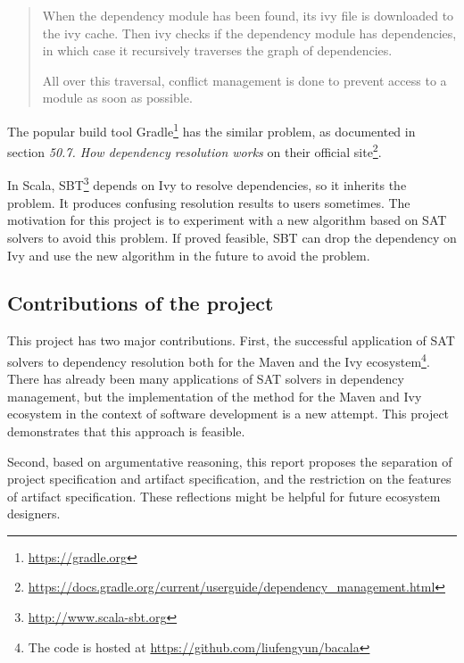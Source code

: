 \begin{quote}
  When the dependency module has been found, its ivy file is downloaded to the ivy cache. Then ivy checks if the dependency module has dependencies, in which case it recursively traverses the graph of dependencies.

  All over this traversal, conflict management is done to prevent access to a module as soon as possible.
\end{quote}

The popular build tool Gradle\footnote{\url{https://gradle.org}} has the similar problem, as documented in section \emph{50.7. How dependency resolution works} on their official site\footnote{\url{https://docs.gradle.org/current/userguide/dependency_management.html}}.

In Scala, SBT\footnote{\url{http://www.scala-sbt.org}} depends on Ivy to resolve dependencies, so it inherits the problem. It produces confusing resolution results to users sometimes. The motivation for this project is to experiment with a new algorithm based on SAT solvers to avoid this problem. If proved feasible, SBT can drop the dependency on Ivy and use the new algorithm in the future to avoid the problem.

\subsection{Contributions of the project}

This project has two major contributions. First, the successful application of SAT solvers to dependency resolution both for the Maven and the Ivy ecosystem\footnote{The code is hosted at \url{https://github.com/liufengyun/bacala}}. There has already been many applications of SAT solvers in dependency management\cite{mancinelli2006managing, berre2009dependency, vouillon2013software}, but the implementation of the method for the Maven and Ivy ecosystem in the context of software development is a new attempt. This project demonstrates that this approach is feasible.

Second, based on argumentative reasoning, this report proposes the separation of project specification and artifact specification, and the restriction on the features of artifact specification. These reflections might be helpful for future ecosystem designers.
